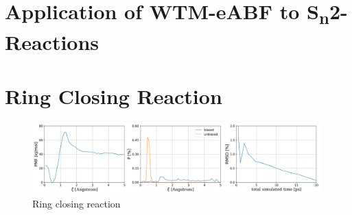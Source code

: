 

\section{Application of WTM-eABF to S\textsubscript{n}2-Reactions}
\label{sec:Sn2}


\section{Ring Closing Reaction}
\label{sec:RCR}

\begin{figure}[H]
  \centering
    \includegraphics[width=0.99\textwidth]{bilder/results/R2_ool_results}
   \caption{Ring closing reaction}
   \label{fig:ool}
\end{figure}
